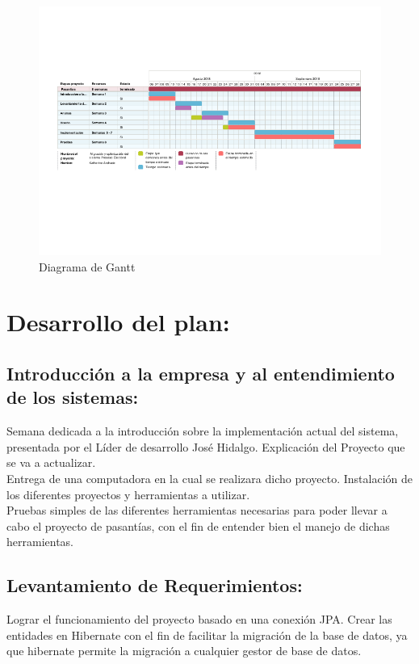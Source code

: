 \documentclass[12pt,oneside]{book}
\begin{document}
	\begin{figure}[htb]
		\centering
		\includegraphics[width=1.1\textwidth]{diagrama1.png}
		\caption{Diagrama de Gantt}
		\label{i1}
	\end{figure}
	
	\break 
	\section{Desarrollo del plan:}
	\subsection{Introducción a la empresa y al entendimiento de los sistemas:}
	Semana dedicada a la introducción sobre la implementación actual del sistema, presentada por el Líder de desarrollo José Hidalgo. Explicación del Proyecto que se va a actualizar. \\
	
	Entrega de una computadora en la cual se realizara dicho proyecto.
	Instalación de los diferentes proyectos y herramientas a utilizar. \\
	
	Pruebas simples de las diferentes herramientas necesarias para poder llevar a cabo el proyecto de pasantías, con el fin de entender bien el manejo de dichas herramientas.
	
	\subsection{Levantamiento de Requerimientos:}
	Lograr el funcionamiento del proyecto basado en una conexión JPA. Crear las entidades en Hibernate con el fin de facilitar la migración de la base de datos, ya que hibernate permite la migración a cualquier gestor de base de datos.\\ 
	
\end{document}
